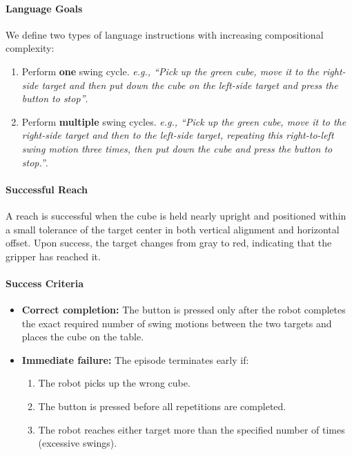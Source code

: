 \paragraph{Language Goals}
We define two types of language instructions with increasing compositional complexity:
\begin{enumerate}[itemsep=1pt, topsep=0pt, leftmargin=*]
    \item Perform \textbf{one} swing cycle.
    \textit{e.g., ``Pick up the green cube, move it to the right-side target and then put down the cube on the left-side target and press the button to stop''}.

    \item Perform \textbf{multiple} swing cycles.
    \textit{e.g., ``Pick up the green cube, move it to the right-side target and then to the left-side target, repeating this right-to-left swing motion three times, then put down the cube and press the button to stop.''}.
\end{enumerate}

\paragraph{Successful Reach} A reach is successful when the cube is held nearly upright and positioned within a small tolerance of the target center in both vertical alignment and horizontal offset. Upon success, the target changes from gray to red, indicating that the gripper has reached it.


\paragraph{Success Criteria}
\begin{itemize}[itemsep=1pt, topsep=0pt, leftmargin=*]
    \item \textbf{Correct completion:} The button is pressed only after the robot completes the exact required number of swing motions between the two targets and places the cube on the table.
        
    \item \textbf{Immediate failure:} The episode terminates early if:
    \begin{enumerate}[itemsep=1pt, topsep=0pt, leftmargin=*]
        \item The robot picks up the wrong cube.
        \item The button is pressed before all repetitions are completed.
        \item The robot reaches either target more than the specified number of times (excessive swings).
    \end{enumerate}
\end{itemize}
\clearpage



